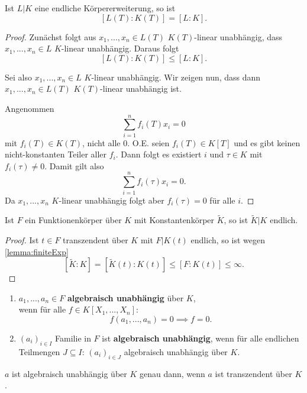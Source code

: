 \begin{lemma}\label{lemma:finiteExp}
    Ist $L|K$ eine endliche Körpererweiterung,
    so ist $$ [L(T):K(T)] = [L:K]. $$
\end{lemma}
\begin{proof}
    Zunächst folgt aus $x_1,...,x_n \in L(T)$ $K(T)$-linear unabhängig, dass
    $x_1,...,x_n \in L$ $K$-linear unabhängig. 
    Daraus folgt$$ [L(T):K(T)] \leq [L:K]. $$

    Sei also $x_1,...,x_n \in L$ $K$-linear unabhängig. Wir zeigen nun, dass dann
    $x_1,...,x_n \in L(T)$ $K(T)$-linear unabhängig ist.
    
    Angenommen $$ \sum\limits_{i=1}^n f_i(T)x_i = 0$$ mit $f_i(T) \in K(T)$, nicht alle 0.
    O.E. seien $f_i(T) \in K[T]$ und es gibt keinen nicht-konstanten Teiler aller $f_i$.
    Dann folgt es existiert $i$ und $\tau \in K$ mit $f_i(\tau) \neq 0$. 
    Damit gilt also $$ \sum\limits_{i=1}^n f_i(\tau)x_i = 0.$$
    Da $x_1,...,x_n$ $K$-linear unabhängig folgt aber $f_i(\tau) = 0$ für alle $i$.

\end{proof}

\begin{satz}\label{satz:1.9}
    Ist $F$ ein Funktionenkörper über $K$ mit Konstantenkörper $\tilde{K}$,
    so ist $\tilde{K}|K$ endlich.
\end{satz}
\begin{proof}
    Ist $t\in F$ transzendent über $K$ mit $F|K(t)$ endlich,
    so ist wegen \cref{lemma:finiteExp} 
    $$ [\tilde{K}:K] = [\tilde{K}(t):K(t)] \leq [F:K(t)] \leq \infty.$$
\end{proof}

\begin{definition}
    \begin{enumerate}[label=\arabic*)]
        \item $a_1,...,a_n \in F$ \textbf{algebraisch unabhängig} über $K$,\\
        wenn für alle $f \in K[X_1,...,X_n]$:
        $$ f(a_1,...,a_n) = 0 \implies f=0. $$

        \item $(a_i)_{i \in I}$ Familie in $F$ ist \textbf{algebraisch unabhängig},
        wenn für alle endlichen Teilmengen $J \subseteq I$:
        $ (a_i)_{i \in J}$ algebraisch unabhängig über $K$.
    \end{enumerate}
\end{definition}

\begin{beispiel}
    $a$ ist algebraisch unabhängig über $K$ genau dann, wenn $a$ ist transzendent über $K$.
\end{beispiel}

